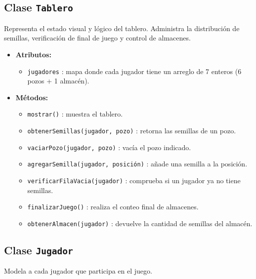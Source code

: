 \documentclass{article}
\begin{document}
\subsection*{Clase \texttt{Tablero}}

Representa el estado visual y lógico del tablero. Administra la distribución de semillas, verificación de final de juego y control de almacenes.

\begin{itemize}
  \item \textbf{Atributos:}
  \begin{itemize}
    \item \texttt{jugadores} : mapa donde cada jugador tiene un arreglo de 7 enteros (6 pozos + 1 almacén).
  \end{itemize}
  
  \item \textbf{Métodos:}
  \begin{itemize}
    \item \texttt{mostrar()} : muestra el tablero.
    \item \texttt{obtenerSemillas(jugador, pozo)} : retorna las semillas de un pozo.
    \item \texttt{vaciarPozo(jugador, pozo)} : vacía el pozo indicado.
    \item \texttt{agregarSemilla(jugador, posición)} : añade una semilla a la posición.
    \item \texttt{verificarFilaVacia(jugador)} : comprueba si un jugador ya no tiene semillas.
    \item \texttt{finalizarJuego()} : realiza el conteo final de almacenes.
    \item \texttt{obtenerAlmacen(jugador)} : devuelve la cantidad de semillas del almacén.
  \end{itemize}
\end{itemize}

\subsection*{Clase \texttt{Jugador}}

Modela a cada jugador que participa en el juego.
\end{document}
